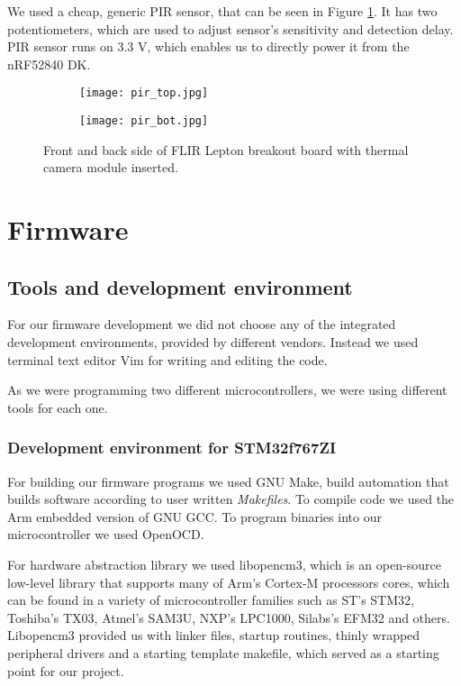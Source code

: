 We used a cheap, generic PIR sensor, that can be seen in Figure \ref{pir_sensor}.
It has two potentiometers, which are used to adjust sensor's sensitivity and detection delay.
PIR sensor runs on 3.3 V, which enables us to directly power it from the nRF52840 DK. 

\begin{figure}[ht] 
    \begin{subfigure}[b]{0.5\textwidth}
        \centering
        \texttt{[image: pir\_top.jpg]} 
    \end{subfigure}
    \begin{subfigure}[b]{0.5\textwidth}
        \centering
        \texttt{[image: pir\_bot.jpg]} 
    \end{subfigure}
    \caption{ Front and back side of FLIR Lepton breakout board with thermal camera module inserted.}
    \label{pir_sensor}
\end{figure}

\section{ Firmware}
\subsection{ Tools and development environment}

For our firmware development we did not choose any of the integrated development environments, provided by different vendors.
Instead we used terminal text editor Vim for writing and editing the code.

As we were programming two different microcontrollers, we were using different tools for each one.


\subsubsection{ Development environment for STM32f767ZI}

For building our firmware programs we used GNU Make, build automation that builds software according to user written \textit{Makefiles}.
To compile code we used the Arm embedded version of GNU GCC.
To program binaries into our microcontroller we used OpenOCD.

For hardware abstraction library we used libopencm3, which is an open-source low-level library that supports many of Arm's Cortex-M processors cores, which can be found in a variety of microcontroller families such as ST's STM32, Toshiba's TX03, Atmel's SAM3U, NXP's LPC1000, Silabs's EFM32 and others.
Libopencm3 provided us with linker files, startup routines, thinly wrapped peripheral drivers and a starting template makefile, which served as a starting point for our project.


